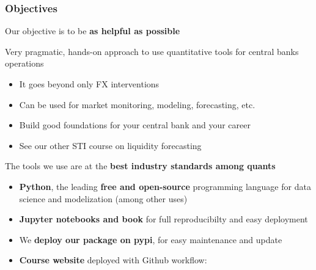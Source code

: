 \documentclass{beamer}
\newenvironment{wideitemize}{\itemize\addtolength{\itemsep}{10pt}}{\enditemize}
\begin{document}
\begin{frame}
\frametitle{Objectives}
\begin{wideitemize}
  \item Our objective is to be \textbf{as helpful as possible}
  \item Very pragmatic, hands-on approach to use quantitative tools for central banks operations
    \begin{itemize}
    \item It goes beyond only FX interventions 
    \item Can be used for market monitoring, modeling, forecasting, etc.
    \item Build good foundations for your central bank and your career
    \item See our other STI course on liquidity forecasting
    \end{itemize}
  \item The tools we use are at the \textbf{best industry standards among quants}
    \begin{itemize}
    \item \textbf{Python}, the leading \textbf{free and open-source} programming language for data science and modelization (among other uses)
    \item \textbf{Jupyter notebooks and book} for full reproducibilty and easy deployment
    \item We \textbf{deploy our package on pypi}, for easy maintenance and update
    \item \textbf{Course website} deployed with Github workflow: \href{https://github.com/amineraboun/STI_FX_Intervention}{}
    \end{itemize}
\end{wideitemize}
\end{frame}
\end{document}

